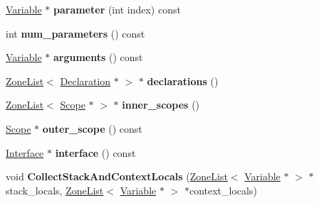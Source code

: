 \begin{DoxyCompactItemize}
\item 
\hypertarget{classv8_1_1internal_1_1_scope_a2bc11ea84ff36e325adca9a6b524226d}{}\hyperlink{classv8_1_1internal_1_1_variable}{Variable} $\ast$ {\bfseries parameter} (int index) const \label{classv8_1_1internal_1_1_scope_a2bc11ea84ff36e325adca9a6b524226d}

\item 
\hypertarget{classv8_1_1internal_1_1_scope_abf2dc87c78971a13940c62801760e98a}{}int {\bfseries num\+\_\+parameters} () const \label{classv8_1_1internal_1_1_scope_abf2dc87c78971a13940c62801760e98a}

\item 
\hypertarget{classv8_1_1internal_1_1_scope_aca31ee71179c70dffd2b7722fa940f4a}{}\hyperlink{classv8_1_1internal_1_1_variable}{Variable} $\ast$ {\bfseries arguments} () const \label{classv8_1_1internal_1_1_scope_aca31ee71179c70dffd2b7722fa940f4a}

\item 
\hypertarget{classv8_1_1internal_1_1_scope_a7ddec523f1cd9d59aa9f72a9c0308cdc}{}\hyperlink{classv8_1_1internal_1_1_zone_list}{Zone\+List}$<$ \hyperlink{classv8_1_1internal_1_1_declaration}{Declaration} $\ast$ $>$ $\ast$ {\bfseries declarations} ()\label{classv8_1_1internal_1_1_scope_a7ddec523f1cd9d59aa9f72a9c0308cdc}

\item 
\hypertarget{classv8_1_1internal_1_1_scope_a0e4d097ff1d3d529fecd08644a1131ba}{}\hyperlink{classv8_1_1internal_1_1_zone_list}{Zone\+List}$<$ \hyperlink{classv8_1_1internal_1_1_scope}{Scope} $\ast$ $>$ $\ast$ {\bfseries inner\+\_\+scopes} ()\label{classv8_1_1internal_1_1_scope_a0e4d097ff1d3d529fecd08644a1131ba}

\item 
\hypertarget{classv8_1_1internal_1_1_scope_a103ace9a050c875d3df6e9f1152765f8}{}\hyperlink{classv8_1_1internal_1_1_scope}{Scope} $\ast$ {\bfseries outer\+\_\+scope} () const \label{classv8_1_1internal_1_1_scope_a103ace9a050c875d3df6e9f1152765f8}

\item 
\hypertarget{classv8_1_1internal_1_1_scope_adef2e4ac765cbeba75f9e8de7e39cabd}{}\hyperlink{classv8_1_1internal_1_1_interface}{Interface} $\ast$ {\bfseries interface} () const \label{classv8_1_1internal_1_1_scope_adef2e4ac765cbeba75f9e8de7e39cabd}

\item 
\hypertarget{classv8_1_1internal_1_1_scope_a6ffd0dbee0a6e5b59ac6d69b7500bdfc}{}void {\bfseries Collect\+Stack\+And\+Context\+Locals} (\hyperlink{classv8_1_1internal_1_1_zone_list}{Zone\+List}$<$ \hyperlink{classv8_1_1internal_1_1_variable}{Variable} $\ast$ $>$ $\ast$stack\+\_\+locals, \hyperlink{classv8_1_1internal_1_1_zone_list}{Zone\+List}$<$ \hyperlink{classv8_1_1internal_1_1_variable}{Variable} $\ast$ $>$ $\ast$context\+\_\+locals)\label{classv8_1_1internal_1_1_scope_a6ffd0dbee0a6e5b59ac6d69b7500bdfc}


\end{DoxyCompactItemize}
